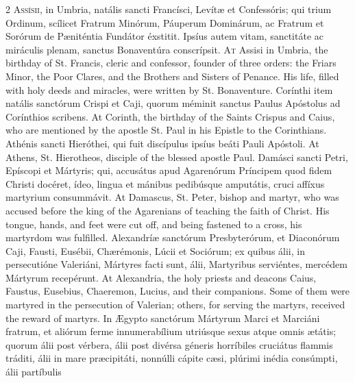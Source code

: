 \begin{paracol}{2}
\lettrine[lines=2]{A}{ssísii,} in Umbria, 
 natális sancti Francísci, Levítæ et Confessóris; qui trium Ordinum, 
 scílicet Fratrum Minórum, Páuperum Dominárum, ac Fratrum et Sorórum de 
 Pæniténtia Fundátor éxstitit. Ipsíus autem vitam, sanctitáte ac 
 miráculis plenam, sanctus Bonaventúra conscrípsit.
\switchcolumn
{}
\lettrine[lines=2]{A}{t} Assisi in Umbria, the birthday of 
 St. Francis, cleric and confessor, founder of three orders: the Friars 
 Minor, the Poor Clares, and the Brothers and Sisters of Penance. His 
 life, filled with holy deeds and miracles, were written by St. Bonaventure.
\switchcolumn*
{}
Corínthi item natális 
 sanctórum Crispi et Caji, quorum méminit sanctus Paulus Apóstolus ad 
 Corínthios scribens.
\switchcolumn
{}
At Corinth, the birthday of the 
 Saints Crispus and Caius, who are mentioned by the apostle St. Paul in his 
 Epistle to the Corinthians.
\switchcolumn*
{}
Athénis sancti 
 Hieróthei, qui fuit discípulus ipsíus beáti Pauli Apóstoli.
\switchcolumn
{}
At Athens, St. Hierotheos, disciple 
 of the blessed apostle Paul.
\switchcolumn*
{}
Damásci sancti Petri, 
 Epíscopi et Mártyris; qui, accusátus apud Agarenórum Príncipem quod fidem 
 Christi docéret, ídeo, lingua et mánibus pedibúsque amputátis, cruci affíxus 
 martyrium consummávit.
\switchcolumn
{}
At Damascus, St. Peter, bishop and 
 martyr, who was accused before the king of the Agarenians of teaching the 
 faith of Christ. His tongue, hands, and feet were cut off, and being 
 fastened to a cross, his martyrdom was fulfilled.
\switchcolumn*
{}
Alexandríæ sanctórum 
 Presbyterórum, et Diaconórum Caji, Fausti, Eusébii, Chærémonis, Lúcii et 
 Sociórum; ex quibus álii, in persecutióne Valeriáni, Mártyres facti sunt, 
 álii, Martyribus serviéntes, mercédem Mártyrum recepérunt.
\switchcolumn
{}
At Alexandria, the holy priests and 
 deacons Caius, Faustus, Eusebius, Chaeremon, Lucius, and their companions. 
 Some of them were martyred in the persecution of Valerian; others, for 
 serving the martyrs, received the reward of martyrs.
\switchcolumn*
{}
In Ægypto sanctórum 
 Mártyrum Marci et Marciáni fratrum, et aliórum ferme innumerabílium 
 utriúsque sexus atque omnis ætátis; quorum álii post vérbera, álii post 
 divérsa géneris horríbiles cruciátus flammis tráditi, álii in mare 
 præcipitáti, nonnúlli cápite cæsi, plúrimi inédia consúmpti, álii partíbulis 

\end{paracol}
